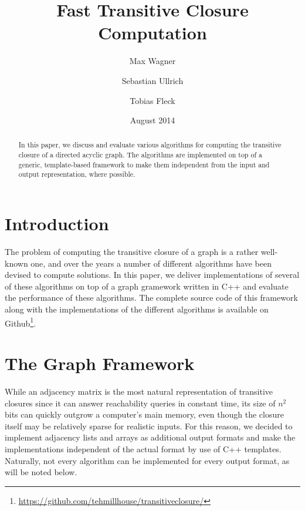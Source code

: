 \documentclass[12pt,a4paper,twoside]{article}
\begin{document}
\title{Fast Transitive Closure Computation}
\author{Max Wagner \and Sebastian Ullrich \and Tobias Fleck}
\date{August 2014}
\maketitle

\def\sectionautorefname{Section}
\def\subsectionautorefname{Subsection}

\newcommand\ie{i.e.\ }
\newcommand\eg{e.g.,\ }
\newcommand\credits[1]{\begin{flushright}\emph{#1}\end{flushright}}

\begin{abstract}
  In this paper, we discuss and evaluate various algorithms for computing the transitive closure of a directed acyclic graph. The algorithms are implemented on top of a generic, template-based framework to make them independent from the input and output representation, where possible.
\end{abstract}

\section{Introduction}

The problem of computing the transitive closure of a graph is a rather well-known one, and over the years a number of different algorithms have been devised to compute solutions. In this paper, we deliver implementations of several of these algorithms on top of a graph gramework written in C++ and evaluate the performance of these algorithms. The complete source code of this framework along with the implementations of the different algorithms is available on Github\footnote{\url{https://github.com/tehmillhouse/transitiveclosure/}}.

\section{The Graph Framework}

While an adjacency matrix is the most natural representation of transitive closures since it can answer reachability queries in constant time, its size of $n^2$ bits can quickly outgrow a computer's main memory, even though the closure itself may be relatively sparse for realistic inputs. For this reason, we decided to implement adjacency lists and arrays as additional output formats and make the implementations independent of the actual format by use of C++ templates. Naturally, not every algorithm can be implemented for every output format, as will be noted below.
\end{document}

